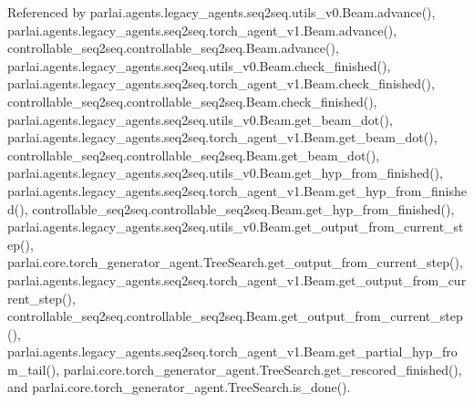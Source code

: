 Referenced by parlai.\+agents.\+legacy\+\_\+agents.\+seq2seq.\+utils\+\_\+v0.\+Beam.\+advance(), parlai.\+agents.\+legacy\+\_\+agents.\+seq2seq.\+torch\+\_\+agent\+\_\+v1.\+Beam.\+advance(), controllable\+\_\+seq2seq.\+controllable\+\_\+seq2seq.\+Beam.\+advance(), parlai.\+agents.\+legacy\+\_\+agents.\+seq2seq.\+utils\+\_\+v0.\+Beam.\+check\+\_\+finished(), parlai.\+agents.\+legacy\+\_\+agents.\+seq2seq.\+torch\+\_\+agent\+\_\+v1.\+Beam.\+check\+\_\+finished(), controllable\+\_\+seq2seq.\+controllable\+\_\+seq2seq.\+Beam.\+check\+\_\+finished(), parlai.\+agents.\+legacy\+\_\+agents.\+seq2seq.\+utils\+\_\+v0.\+Beam.\+get\+\_\+beam\+\_\+dot(), parlai.\+agents.\+legacy\+\_\+agents.\+seq2seq.\+torch\+\_\+agent\+\_\+v1.\+Beam.\+get\+\_\+beam\+\_\+dot(), controllable\+\_\+seq2seq.\+controllable\+\_\+seq2seq.\+Beam.\+get\+\_\+beam\+\_\+dot(), parlai.\+agents.\+legacy\+\_\+agents.\+seq2seq.\+utils\+\_\+v0.\+Beam.\+get\+\_\+hyp\+\_\+from\+\_\+finished(), parlai.\+agents.\+legacy\+\_\+agents.\+seq2seq.\+torch\+\_\+agent\+\_\+v1.\+Beam.\+get\+\_\+hyp\+\_\+from\+\_\+finished(), controllable\+\_\+seq2seq.\+controllable\+\_\+seq2seq.\+Beam.\+get\+\_\+hyp\+\_\+from\+\_\+finished(), parlai.\+agents.\+legacy\+\_\+agents.\+seq2seq.\+utils\+\_\+v0.\+Beam.\+get\+\_\+output\+\_\+from\+\_\+current\+\_\+step(), parlai.\+core.\+torch\+\_\+generator\+\_\+agent.\+Tree\+Search.\+get\+\_\+output\+\_\+from\+\_\+current\+\_\+step(), parlai.\+agents.\+legacy\+\_\+agents.\+seq2seq.\+torch\+\_\+agent\+\_\+v1.\+Beam.\+get\+\_\+output\+\_\+from\+\_\+current\+\_\+step(), controllable\+\_\+seq2seq.\+controllable\+\_\+seq2seq.\+Beam.\+get\+\_\+output\+\_\+from\+\_\+current\+\_\+step(), parlai.\+agents.\+legacy\+\_\+agents.\+seq2seq.\+torch\+\_\+agent\+\_\+v1.\+Beam.\+get\+\_\+partial\+\_\+hyp\+\_\+from\+\_\+tail(), parlai.\+core.\+torch\+\_\+generator\+\_\+agent.\+Tree\+Search.\+get\+\_\+rescored\+\_\+finished(), and parlai.\+core.\+torch\+\_\+generator\+\_\+agent.\+Tree\+Search.\+is\+\_\+done().

\mbox{\label{classparlai_1_1agents_1_1legacy__agents_1_1seq2seq_1_1torch__agent__v1_1_1Beam_aadd5d9795e5d7ac5c5339d6136eb7ba4}} 
